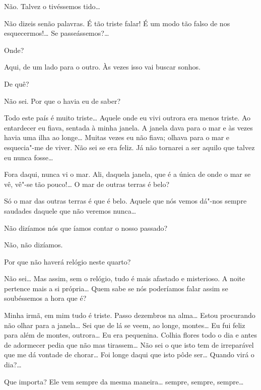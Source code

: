  Não. Talvez o tivéssemos tido\ldots{}

 Não dizeis senão palavras.
É tão triste falar! É um modo tão
falso de nos esquecermos!\ldots{} Se passeássemos?\ldots{}

 Onde?

 Aqui, de um lado para o outro. Às vezes isso vai buscar
sonhos.

 De quê?

 Não sei. Por que o havia eu de saber?

\hfill{} 

 Todo este país é muito triste\ldots{} 
Aquele onde eu vivi outrora
era menos triste. Ao entardecer eu fiava, 
sentada à minha janela. A janela dava para o mar
e às vezes havia uma ilha ao longe\ldots{} Muitas
vezes eu não fiava; olhava para o mar e esquecia"-me
de viver. Não sei se era feliz. Já não tornarei a ser
aquilo que talvez eu nunca fosse\ldots{}

 Fora daqui, nunca vi o mar.
Ali, daquela janela, que é a
única de onde o mar se vê, vê"-se tão pouco!\ldots{} 
O mar de outras terras é belo?

 Só o mar das outras terras é que é belo.
Aquele que nós vemos
dá"-nos sempre saudades daquele que não veremos nunca\ldots{}

\hfill{} 

 Não dizíamos nós que íamos contar o nosso passado?

 Não, não dizíamos.

 Por que não haverá relógio neste quarto?

 Não sei\ldots{} Mas assim, sem o relógio,
tudo é mais afastado e
misterioso. A noite pertence mais a si própria\ldots{} 
Quem sabe se nós
poderíamos falar assim se soubéssemos a hora que é?

 Minha irmã, em mim tudo é triste.
Passo dezembros na alma\ldots{}
Estou procurando não olhar para a janela\ldots{}
Sei que de lá se veem, ao longe, montes\ldots{}
Eu fui feliz para além de montes, outrora\ldots{} Eu era
pequenina. Colhia flores todo o dia e antes de 
adormecer pedia que não mas tirassem\ldots{}
Não sei o que isto tem de irreparável que me dá vontade
de chorar\ldots{} Foi longe daqui que isto pôde
ser\ldots{} Quando virá o dia?\ldots{}

 Que importa? Ele vem sempre da
mesma maneira\ldots{} sempre, sempre, sempre\ldots{}

